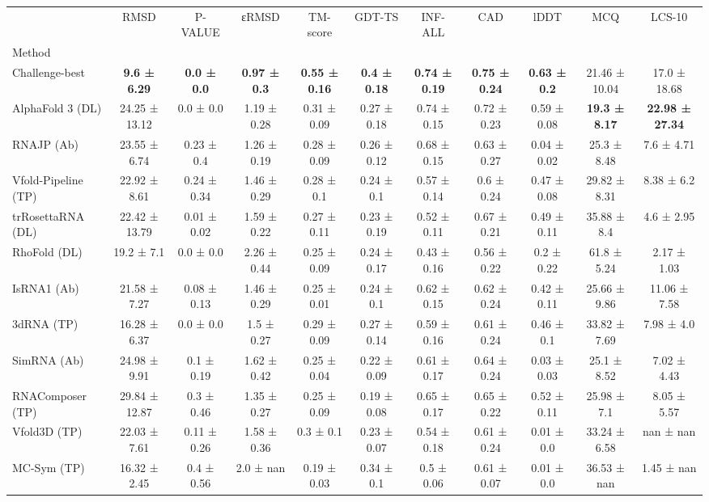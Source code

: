 \begin{tabular}{lcccccccccc}
\toprule
 & RMSD & P-VALUE & εRMSD & TM-score & GDT-TS & INF-ALL & CAD & lDDT & MCQ & LCS-10 \\
Method &  &  &  &  &  &  &  &  &  &  \\
\midrule
Challenge-best & \textbf{9.6 ± 6.29} & \textbf{0.0 ± 0.0} & \textbf{0.97 ± 0.3} & \textbf{0.55 ± 0.16} & \textbf{0.4 ± 0.18} & \textbf{0.74 ± 0.19} & \textbf{0.75 ± 0.24} & \textbf{0.63 ± 0.2} & 21.46 ± 10.04 & 17.0 ± 18.68 \\
AlphaFold 3 (DL) & 24.25 ± 13.12 & 0.0 ± 0.0 & 1.19 ± 0.28 & 0.31 ± 0.09 & 0.27 ± 0.18 & 0.74 ± 0.15 & 0.72 ± 0.23 & 0.59 ± 0.08 & \textbf{19.3 ± 8.17} & \textbf{22.98 ± 27.34} \\
RNAJP (Ab) & 23.55 ± 6.74 & 0.23 ± 0.4 & 1.26 ± 0.19 & 0.28 ± 0.09 & 0.26 ± 0.12 & 0.68 ± 0.15 & 0.63 ± 0.27 & 0.04 ± 0.02 & 25.3 ± 8.48 & 7.6 ± 4.71 \\
Vfold-Pipeline (TP) & 22.92 ± 8.61 & 0.24 ± 0.34 & 1.46 ± 0.29 & 0.28 ± 0.1 & 0.24 ± 0.1 & 0.57 ± 0.14 & 0.6 ± 0.24 & 0.47 ± 0.08 & 29.82 ± 8.31 & 8.38 ± 6.2 \\
trRosettaRNA (DL) & 22.42 ± 13.79 & 0.01 ± 0.02 & 1.59 ± 0.22 & 0.27 ± 0.11 & 0.23 ± 0.19 & 0.52 ± 0.11 & 0.67 ± 0.21 & 0.49 ± 0.11 & 35.88 ± 8.4 & 4.6 ± 2.95 \\
RhoFold (DL) & 19.2 ± 7.1 & 0.0 ± 0.0 & 2.26 ± 0.44 & 0.25 ± 0.09 & 0.24 ± 0.17 & 0.43 ± 0.16 & 0.56 ± 0.22 & 0.2 ± 0.22 & 61.8 ± 5.24 & 2.17 ± 1.03 \\
IsRNA1 (Ab) & 21.58 ± 7.27 & 0.08 ± 0.13 & 1.46 ± 0.29 & 0.25 ± 0.01 & 0.24 ± 0.1 & 0.62 ± 0.15 & 0.62 ± 0.24 & 0.42 ± 0.11 & 25.66 ± 9.86 & 11.06 ± 7.58 \\
3dRNA (TP) & 16.28 ± 6.37 & 0.0 ± 0.0 & 1.5 ± 0.27 & 0.29 ± 0.09 & 0.27 ± 0.14 & 0.59 ± 0.16 & 0.61 ± 0.24 & 0.46 ± 0.1 & 33.82 ± 7.69 & 7.98 ± 4.0 \\
SimRNA (Ab) & 24.98 ± 9.91 & 0.1 ± 0.19 & 1.62 ± 0.42 & 0.25 ± 0.04 & 0.22 ± 0.09 & 0.61 ± 0.17 & 0.64 ± 0.24 & 0.03 ± 0.03 & 25.1 ± 8.52 & 7.02 ± 4.43 \\
RNAComposer (TP) & 29.84 ± 12.87 & 0.3 ± 0.46 & 1.35 ± 0.27 & 0.25 ± 0.09 & 0.19 ± 0.08 & 0.65 ± 0.17 & 0.65 ± 0.22 & 0.52 ± 0.11 & 25.98 ± 7.1 & 8.05 ± 5.57 \\
Vfold3D (TP) & 22.03 ± 7.61 & 0.11 ± 0.26 & 1.58 ± 0.36 & 0.3 ± 0.1 & 0.23 ± 0.07 & 0.54 ± 0.18 & 0.61 ± 0.24 & 0.01 ± 0.0 & 33.24 ± 6.58 & nan ± nan \\
MC-Sym (TP) & 16.32 ± 2.45 & 0.4 ± 0.56 & 2.0 ± nan & 0.19 ± 0.03 & 0.34 ± 0.1 & 0.5 ± 0.06 & 0.61 ± 0.07 & 0.01 ± 0.0 & 36.53 ± nan & 1.45 ± nan \\
\bottomrule
\end{tabular}
